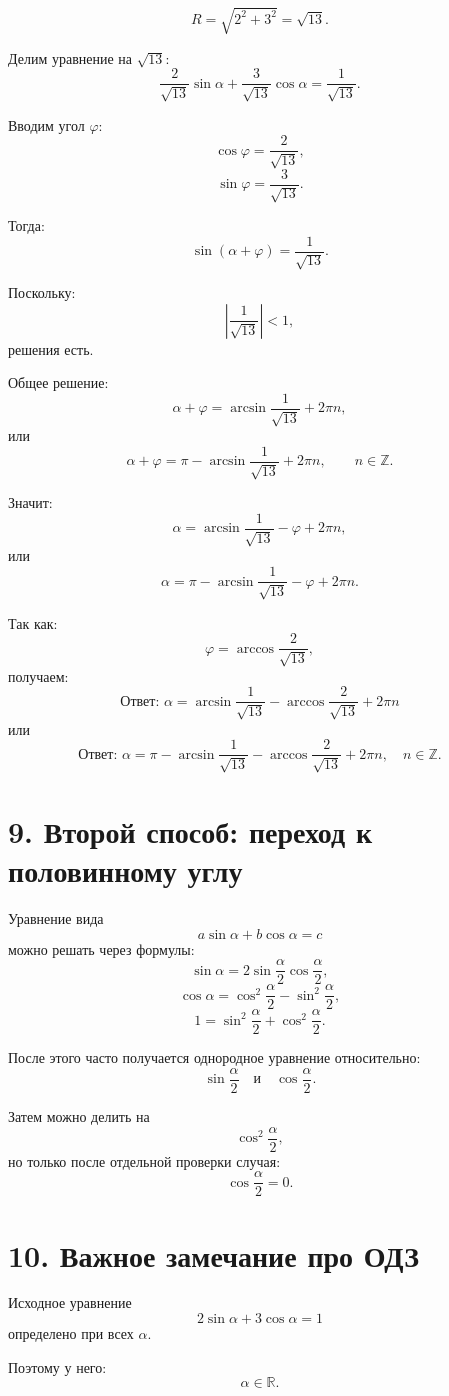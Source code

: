 \documentclass[a4paper,12pt]{article}
\newcommand{\answer}[1]{\textbf{Ответ: }#1}
\begin{document}
\[
R=\sqrt{2^2+3^2}=\sqrt{13}.
\]

Делим уравнение на \(\sqrt{13}\):
\[
\frac{2}{\sqrt{13}}\sin\alpha+
\frac{3}{\sqrt{13}}\cos\alpha
=
\frac{1}{\sqrt{13}}.
\]

Вводим угол \(\varphi\):
\[
\cos\varphi=\frac{2}{\sqrt{13}},
\]
\[
\sin\varphi=\frac{3}{\sqrt{13}}.
\]

Тогда:
\[
\sin(\alpha+\varphi)=\frac{1}{\sqrt{13}}.
\]

Поскольку:
\[
\left|\frac{1}{\sqrt{13}}\right|<1,
\]
решения есть.

Общее решение:
\[
\alpha+\varphi=\arcsin\frac{1}{\sqrt{13}}+2\pi n,
\]
или
\[
\alpha+\varphi=\pi-\arcsin\frac{1}{\sqrt{13}}+2\pi n,
\qquad n\in\mathbb Z.
\]

Значит:
\[
\alpha=\arcsin\frac{1}{\sqrt{13}}-\varphi+2\pi n,
\]
или
\[
\alpha=\pi-\arcsin\frac{1}{\sqrt{13}}-\varphi+2\pi n.
\]

Так как:
\[
\varphi=\arccos\frac{2}{\sqrt{13}},
\]
получаем:
\[
\answer{
\displaystyle
\alpha=\arcsin\frac{1}{\sqrt{13}}-\arccos\frac{2}{\sqrt{13}}+2\pi n
}
\]
или
\[
\answer{
\displaystyle
\alpha=\pi-\arcsin\frac{1}{\sqrt{13}}-\arccos\frac{2}{\sqrt{13}}+2\pi n,\quad n\in\mathbb Z.
}
\]

\section*{9. Второй способ: переход к половинному углу}

Уравнение вида
\[
a\sin\alpha+b\cos\alpha=c
\]
можно решать через формулы:
\[
\sin\alpha=2\sin\frac{\alpha}{2}\cos\frac{\alpha}{2},
\]
\[
\cos\alpha=\cos^2\frac{\alpha}{2}-\sin^2\frac{\alpha}{2},
\]
\[
1=\sin^2\frac{\alpha}{2}+\cos^2\frac{\alpha}{2}.
\]

После этого часто получается однородное уравнение относительно:
\[
\sin\frac{\alpha}{2}
\quad \text{и} \quad
\cos\frac{\alpha}{2}.
\]

Затем можно делить на
\[
\cos^2\frac{\alpha}{2},
\]
но только после отдельной проверки случая:
\[
\cos\frac{\alpha}{2}=0.
\]

\section*{10. Важное замечание про ОДЗ}

Исходное уравнение
\[
2\sin\alpha+3\cos\alpha=1
\]
определено при всех \(\alpha\).

Поэтому у него:
\[
\alpha\in\mathbb R.
\]
\end{document}
